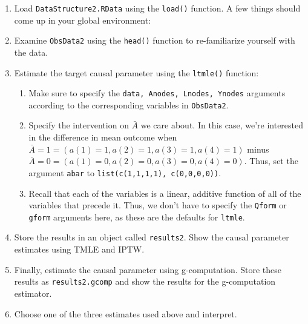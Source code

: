\documentclass[answers]{exam}
\newenvironment{packed_item}{
\begin{itemize}
 \setlength{\itemsep}{0pt}
  \setlength{\parskip}{0pt}
  \setlength{\parsep}{0pt}
}{\end{itemize}}
\begin{document}
\begin{enumerate}
\item Load \texttt{DataStructure2.RData} using the \texttt{load()} function. A few things should come up in your global environment:
\item Examine \texttt{ObsData2} using the \texttt{head()} function to re-familiarize yourself with the data.
\item Estimate the target causal parameter using the \texttt{ltmle()} function:
\begin{enumerate}
\item Make sure to specify the \texttt{data, Anodes, Lnodes, Ynodes} arguments according to the corresponding variables in \texttt{ObsData2}. 
\item Specify the intervention on $\bar{A}$ we care about. In this case, we're interested in the difference in mean outcome when $\bar{A} = 1 = (a(1) = 1, a(2) = 1, a(3) = 1, a(4) = 1)$ minus $\bar{A} = 0 = (a(1) = 0, a(2) = 0, a(3) = 0, a(4) = 0)$. Thus, set the argument \texttt{abar} to \texttt{list(c(1,1,1,1), c(0,0,0,0))}.
\item Recall that each of the variables is a linear, additive function of all of the variables that precede it. Thus, we don't have to specify the \texttt{Qform} or \texttt{gform} arguments here, as these are the defaults for \texttt{ltmle}.
\end{enumerate}
\item Store the results in an object called \texttt{results2}. Show the causal parameter estimates using TMLE and IPTW.
\item Finally, estimate the causal parameter using g-computation. Store these results as \texttt{results2.gcomp} and show the results for the g-computation estimator.
\item Choose one of the three estimates used above and interpret.
\end{enumerate}
\end{document}
